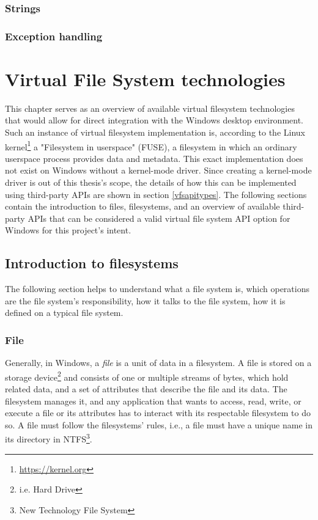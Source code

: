 \subsection*{Strings}

\subsection*{Exception handling}



\chapter{Virtual File System technologies}
\label{ch3}
This chapter serves as an overview of available virtual filesystem technologies that would allow for direct integration with the Windows desktop environment. Such an instance of virtual filesystem implementation is, according to the Linux kernel\footnote{\url{https://kernel.org}} a "Filesystem in userspace" (FUSE), a filesystem in which an ordinary userspace process provides data and metadata.\cite{FUSE}
This exact implementation does not exist on Windows without a kernel-mode driver\cite{WinKernelFS}. Since creating a kernel-mode driver is out of this thesis's scope, the details of how this can be implemented using third-party APIs are shown in section \ref{vfsapitypes}.
The following sections contain the introduction to files, filesystems, and an overview of available third-party APIs that can be considered a valid virtual file system API option for Windows for this project's intent.

\section{Introduction to filesystems}
The following section helps to understand what a file system is, which operations are the file system's responsibility, how it talks to the file system, how it is defined on a typical file system.

\subsection*{File}
\label{file}
Generally, in Windows, a \textit{file} is a unit of data in a filesystem. A file is stored on a storage device\footnote{i.e. Hard Drive} and consists of one or multiple streams of bytes, which hold related data, and a set of attributes that describe the file and its data. The filesystem manages it, and any application that wants to access, read, write, or execute a file or its attributes has to interact with its respectable filesystem to do so. A file must follow the filesystems' rules, i.e., a file must have a unique name in its directory in NTFS\footnote{New Technology File System}.\cite{FilesAndClusters}


